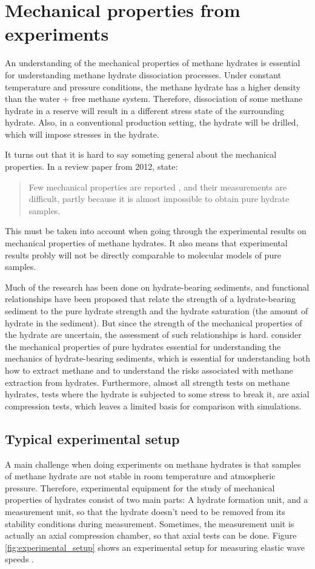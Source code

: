 \section{Mechanical properties from experiments}
An understanding of the mechanical properties of methane hydrates is essential for understanding methane hydrate dissociation processes. Under constant temperature and pressure conditions, the methane hydrate has a higher density than the water + free methane system. Therefore, dissociation of some methane hydrate in a reserve will result in a different stress state of the surrounding hydrate. Also, in a conventional production setting, the hydrate will be drilled, which will impose stresses in the hydrate. 

It turns out that it is hard to say someting general about the mechanical properties. In a review paper from 2012, \citet{Ning2012} state:
\begin{quotation}
Few mechanical properties are reported , and their measurements are difficult, partly because it is almost impossible to obtain pure hydrate samples.
\end{quotation}
%
This must be taken into account when going through the experimental results on mechanical properties of methane hydrates. It also means that experimental results probly will not be directly comparable to molecular models of pure samples.

Much of the research has been done on hydrate-bearing sediments, and functional relationships have been proposed that relate the strength of a hydrate-bearing sediment to the pure hydrate strength and the hydrate saturation (the amount of hydrate in the sediment). But since the strength of the mechanical properties of the hydrate are uncertain, the assessment of such relationships is hard. \citet{Ning2012} consider the mechanical properties of pure hydrates essential for understanding the mechanics of hydrate-bearing sediments, which is essential for understanding both how to extract methane and to understand the risks associated with methane extraction from hydrates. Furthermore, almost all strength tests on methane hydrates, tests where the hydrate is subjected to some stress to break it, are axial compression tests, which leaves a limited basis for comparison with simulations. 

\subsection{Typical experimental setup}
A main challenge when doing experiments on methane hydrates is that samples of methane hydrate are not stable in room temperature and atmospheric pressure. Therefore, experimental equipment for the study of mechanical properties of hydrates consist of two main parts: A hydrate formation unit, and a measurement unit, so that the hydrate doesn't need to be removed from its stability conditions during measurement. Sometimes, the measurement unit is actually an axial compression chamber, so that axial tests can be done. Figure \ref{fig:experimental_setup} shows an experimental setup for measuring elastic wave speeds \cite{Waite2000}.


